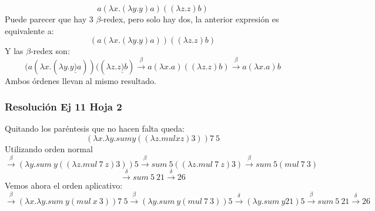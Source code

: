 \documentclass[openany]{book}
\begin{document}
$$ a(\lambda x. (\lambda y.y)a)((\lambda z.z)b) $$
Puede parecer que hay 3 $ \beta  $-redex, pero solo hay dos, la anterior expresión es equivalente a:
$$ (a(\lambda x. (\lambda y.y)a))((\lambda z.z)b) $$
Y las $ \beta $-redex son:
$$ (a(\lambda x. (\lambda y.y\underline{)}a))((\lambda z.z\underline{)}b) \xrightarrow{\beta} a(\lambda x.a)((\lambda z.z)b) \xrightarrow{\beta} a(\lambda x.a)b $$
Ambos órdenes llevan al mismo resultado.

\subsubsection*{Resolución Ej 11 Hoja 2}

Quitando los paréntesis que no hacen falta queda:
$$ (\lambda x.\lambda y.sum y((\lambda z.mul x z)3))7\  5 $$ 
Utilizando orden normal
$$ \xrightarrow{\beta} (\lambda y. sum\ y((\lambda z. mul\ 7\ z)3))5 \xrightarrow{\beta} sum\ 5((\lambda z.mul\ 7\ z)3) \xrightarrow{\beta} sum\ 5 (mul\ 7\ 3) $$
$$ \xrightarrow{\delta} sum\ 5\ 21 \xrightarrow{\delta}26 $$
Vemos ahora el orden aplicativo:
$$ \xrightarrow{\beta} (\lambda x.\lambda y.sum\ y(mul\ x\ 3))7\ 5\xrightarrow{\beta} (\lambda y.sum\ y(mul\ 7\ 3))5 \xrightarrow{\delta} (\lambda  y.sum\ y 21)5 \xrightarrow{\beta} sum\ 5\ 21 \xrightarrow{\delta} 26 $$
\end{document}
